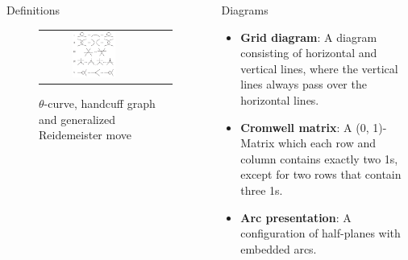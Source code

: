 \documentclass[final]{beamer}
\begin{document}
\begin{frame}[t]
\begin{columns}[t]
\begin{block}{Definitions}
\begin{figure}[h]
\begin{tabular}{ccc}
          \includegraphics[width=0.43\textwidth]{figure/reidemeister.png} \\
        \end{tabular}
        \caption{$\theta$-curve, handcuff graph and generalized Reidemeister move}
    \end{figure}

    
  \end{block}
  \begin{block}{Diagrams}

    \begin{Diagrams}
      \caption{An algorithm with caption}\label{alg:cap}
      \begin{itemize} 
        \item \textbf{Grid diagram}: A diagram consisting of horizontal and vertical lines, where the vertical lines always pass over the horizontal lines.
        \item \textbf{Cromwell matrix}: A (0, 1)-Matrix which each row and column contains exactly two 1s, except for two rows that contain three 1s.
        \item \textbf{Arc presentation}: A configuration of half-planes with embedded arcs.
      \end{itemize}


\end{Diagrams}
\end{block}
\end{columns}
\end{frame}
\end{document}
